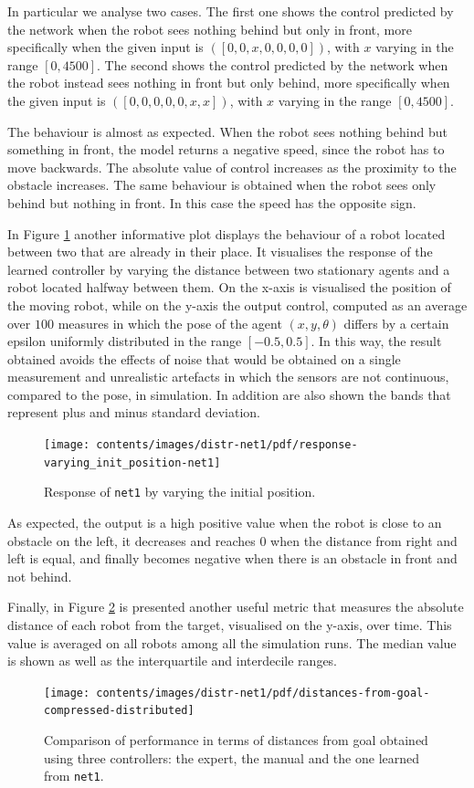 In particular we analyse two cases. The first one shows the control predicted by 
the network when the robot sees nothing behind but only in front, more 
specifically when the given input is  $([0, 0, x, 0, 0, 0, 0])$, with $x$ varying in the 
range $[0, 4500]$.
The second shows the control predicted by the network when the robot instead 
sees nothing in front but only behind, more specifically when the given input is  
$([0, 0, 0, 0, 0,x , x])$, with $x$ varying in the range $[0, 4500]$.

The behaviour is almost as expected. When the robot sees nothing behind but 
something in front, the model returns a negative speed, since the robot has to 
move backwards. 
The absolute value of control increases as the proximity to the obstacle increases.
The same behaviour is obtained when the robot sees only behind but nothing in 
front. In this case the speed has the opposite sign.

In Figure \ref{fig:net1responseposition} another informative plot displays the 
behaviour of a robot located between two that are already in their place.
It visualises the response of the learned controller by varying the distance 
between two stationary agents and a robot located halfway between them.
On the x-axis is visualised the position of the moving robot, while on the y-axis 
the output control, computed as an average over $100$ measures in which the 
pose of the agent $(x, y, \theta)$ differs by a certain epsilon uniformly distributed 
in the range $[-0.5, 0.5]$. In this way, the result obtained avoids the effects of 
noise that would be obtained on a single measurement and unrealistic artefacts in 
which the sensors are not continuous, compared to the pose, in simulation. In 
addition are also shown the bands that represent plus and minus standard 
deviation.
\begin{figure}[!htb]
	\centering
	\texttt{[image: contents/images/distr-net1/pdf/response-varying\_init\_position-net1]}%
	\caption{Response of \texttt{net1} by varying the initial position.}
	\label{fig:net1responseposition}
\end{figure}

As expected, the output is a high positive value when the robot is close to an 
obstacle on the left, it decreases and reaches $0$ when the distance from right 
and left is equal, and finally becomes negative when there is an obstacle in front 
and not behind.

Finally, in Figure \ref{fig:net1distance} is presented another useful metric that 
measures the absolute distance of each robot from the target, visualised on the 
y-axis, over time. This value is averaged on all robots among all the simulation 
runs. The median value is shown as well as the interquartile and interdecile ranges.
\begin{figure}[!htb]
	\centering
	\texttt{[image: contents/images/distr-net1/pdf/distances-from-goal-compressed-distributed]}%
	\caption[Evaluation of \texttt{net1} distances from goal.]{Comparison of 
	performance in terms of distances from goal obtained using three controllers: 
	the expert, the manual and the one learned from \texttt{net1}.}
	\label{fig:net1distance}
\end{figure}

